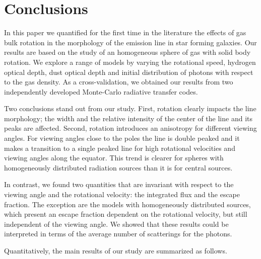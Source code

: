 \documentclass{emulateapj}
\newcommand{\ly}{{\ifmmode{{\rm Ly}\alpha~}\else{Ly$\alpha$~}\fi}}
\begin{document}
 

\section{Conclusions}
\label{sec:conclusions}

In this paper we quantified for the first time in the literature the effects
of gas bulk rotation in the morphology of the \ly emission line in star forming
galaxies.  Our results are based on the study of an homogeneous sphere
of gas with solid body rotation. We explore a range of models by varying
the rotational speed, hydrogen optical depth, dust optical depth and
initial distribution of \ly photons with respect to the gas
density. As a cross-validation, we obtained our results from two
independently developed Monte-Carlo radiative transfer codes. 

Two conclusions stand out from our study. First, rotation clearly impacts the \ly line
morphology; the width and the relative intensity of the center of the
line and its peaks are affected. Second, rotation introduces an
anisotropy for different viewing angles. For viewing angles close to
the poles the line is double peaked and it makes a transition to a
single peaked line for high rotational velocities and viewing angles
along the equator. This trend is clearer for spheres with
homogeneously distributed radiation sources than it is for central
sources.     


In contrast, we found two quantities that are invariant with respect
to the viewing angle and the rotational velocity: the integrated flux and the escape
fraction.  The exception are the models with homogeneously distributed
sources, which present an escape fraction dependent on the rotational
velocity, but still independent of the viewing angle. We showed that
these results could be interpreted in terms of the average number of
scatterings for the photons.


Quantitatively, the main results of our study are summarized as
follows. 
\end{document}

